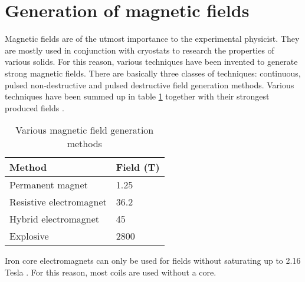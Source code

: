 \section{Generation of magnetic fields}

Magnetic fields are of the utmost importance to the experimental physicist.  
They are mostly used in conjunction with cryostats to research the properties 
of various solids. For this reason, various techniques have been invented to 
generate strong magnetic fields. There are basically three classes of 
techniques: continuous, pulsed non-destructive and pulsed destructive field 
generation methods. Various techniques have been summed up in table 
\ref{methodTable} together with their strongest produced fields 
\cite{highPulsedMagnet} \cite{recordField}.

\begin{table}
\caption{Various magnetic field generation methods}
\label{methodTable}
\begin{tabular}{l|l}
Method & Field (T) \\
\hline
\hline
Permanent magnet & 1.25\\
Resistive electromagnet & 36.2\\
Hybrid electromagnet & 45\\
Explosive & 2800 \\
\end{tabular}
\end{table}

Iron core electromagnets can only be used for fields without saturating up to 
2.16 Tesla \cite{ironSaturation}. For this reason, most coils are used without 
a core. 
